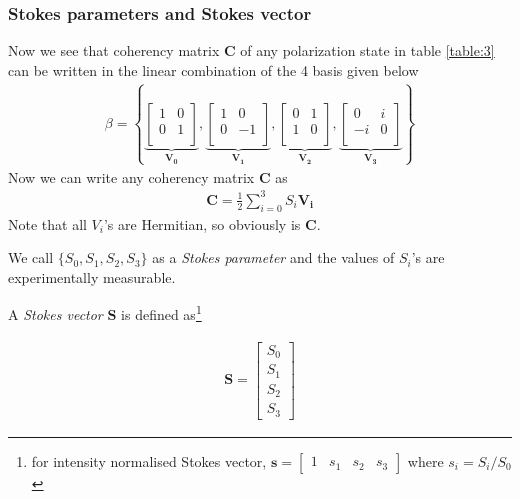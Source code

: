 \documentclass[11pt,a4paper]{article}
\numberwithin{equation}{section}
\begin{document}
\subsubsection{Stokes parameters and Stokes vector}
Now we see that coherency matrix $\boldsymbol{C}$ of any polarization state in table \ref{table:3} can be written in the linear combination of the 4 basis given below \cite{simon 10}
\begin{align}
	\beta = \left\{
	\underbrace{\begin{bmatrix}1 & 0 \\ 0 & 1\\\end{bmatrix}}_{\boldsymbol{V_0}},
	\underbrace{\begin{bmatrix}1 & 0 \\ 0 & -1\\\end{bmatrix}}_{\boldsymbol{V_1}},
	\underbrace{\begin{bmatrix}0 & 1 \\ 1 & 0\\\end{bmatrix}}_{\boldsymbol{V_2}},
	\underbrace{\begin{bmatrix}0 & i \\ -i & 0\\\end{bmatrix}}_{\boldsymbol{V_3}}
	\right\}
\end{align}
Now we can write any coherency matrix $ \boldsymbol{C} $ as 
\begin{align}
\boldsymbol{C} = \frac{1}{2} \sum_{i=0}^{3} S_i \boldsymbol{V_i} \label{eq:1.12}
\end{align}
Note that all $V_i$'s are Hermitian, so obviously is $ \boldsymbol{C} $.

We call $\{S_0, S_1, S_2, S_3\}$ as a \textit{Stokes parameter} and the values of $S_i$'s are experimentally measurable.

A \textit{Stokes vector} $ \boldsymbol{S} $ is defined as\footnote{for intensity normalised Stokes vector, $\boldsymbol{s}= \begin{bmatrix} 1& s_1& s_2& s_3\end{bmatrix}$ where $s_i=S_i/S_0$}

\begin{align}
	\boldsymbol{S}= \begin{bmatrix} S_0\\ S_1\\ S_2\\S_3\end{bmatrix}
\end{align}
\end{document}
